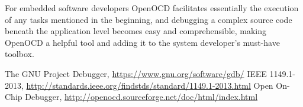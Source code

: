 \documentclass[10pt, a5paper]{article}
\begin{document}
For embedded software developers OpenOCD facilitates essentially the execution of any tasks mentioned in the beginning, and debugging a complex source code beneath the application level becomes easy and comprehensible, making OpenOCD a helpful tool and adding it to the system developer's must-have toolbox.


\begin{thebibliography}{9}
 The GNU Project Debugger, \url{https://www.gnu.org/software/gdb/}
 IEEE 1149.1-2013, \url{http://standards.ieee.org/findstds/standard/1149.1-2013.html}
 Open On-Chip Debugger, \url{http://openocd.sourceforge.net/doc/html/index.html}
\end{thebibliography}
\end{document}
